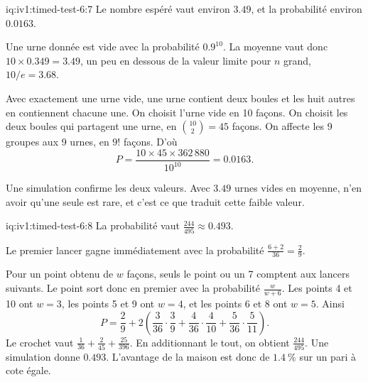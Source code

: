 \begin{solution}{iq:iv1:timed-test-6:7}
Le nombre espéré vaut environ $3.49$, et la probabilité environ $0.0163$.

Une urne donnée est vide avec la probabilité $0.9^{10}$. La moyenne vaut donc $10 \times 0.349 = 3.49$, un peu en dessous de la valeur limite pour $n$ grand, $10/e = 3.68$.

Avec exactement une urne vide, une urne contient deux boules et les huit autres en contiennent chacune une. On choisit l'urne vide en 10 façons. On choisit les deux boules qui partagent une urne, en $\binom{10}{2} = 45$ façons. On affecte les 9 groupes aux 9 urnes, en $9!$ façons. D'où
\[
P = \frac{10 \times 45 \times 362\,880}{10^{10}} = 0.0163.
\]

Une simulation confirme les deux valeurs. Avec $3.49$ urnes vides en moyenne, n'en avoir qu'une seule est rare, et c'est ce que traduit cette faible valeur.

\end{solution}

\begin{solution}{iq:iv1:timed-test-6:8}
La probabilité vaut $\frac{244}{495} \approx 0.493$.

Le premier lancer gagne immédiatement avec la probabilité $\frac{6 + 2}{36} = \frac29$.

Pour un point obtenu de $w$ façons, seuls le point ou un 7 comptent aux lancers suivants. Le point sort donc en premier avec la probabilité $\frac{w}{w + 6}$. Les points 4 et 10 ont $w = 3$, les points 5 et 9 ont $w = 4$, et les points 6 et 8 ont $w = 5$. Ainsi
\[
P = \frac29 + 2\left(\frac{3}{36} \cdot \frac39 + \frac{4}{36} \cdot \frac{4}{10} + \frac{5}{36} \cdot \frac{5}{11}\right).
\]
Le crochet vaut $\frac{1}{36} + \frac{2}{45} + \frac{25}{396}$. En additionnant le tout, on obtient $\frac{244}{495}$. Une simulation donne $0.493$. L'avantage de la maison est donc de $1.4~\%$ sur un pari à cote égale.

\end{solution}

